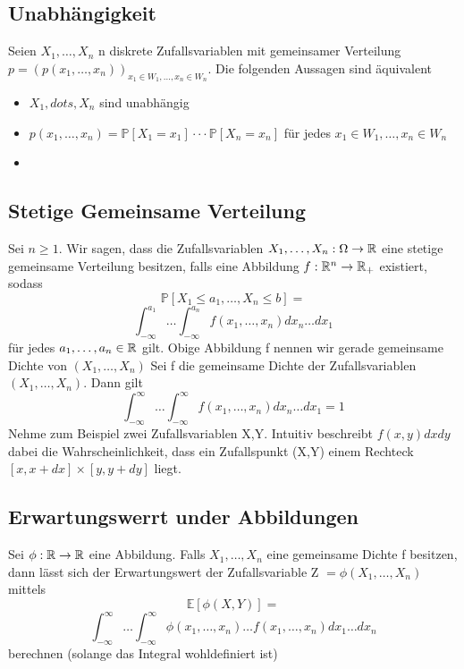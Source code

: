 \subsection{Unabhängigkeit}
\Satz[5.6] \newline
Seien \(X_1, \dots , X_n\) n diskrete Zufallsvariablen mit gemeinsamer Verteilung \(p = (p(x_1, \dots , x_n))_{x_1 \in W_1 , \dots , x_n \in W_n}\). Die folgenden Aussagen sind äquivalent
\begin{itemize}
    \item \(X_1, dots , X_n\) sind unabhängig
    \item \(p(x_1, \dots , x_n ) = \mathbb{P}[X_1 = x_1 ] \cdot \cdot \cdot \mathbb{P}[X_n = x_n ]\) für jedes \(x_1 \in W_1 , \dots , x_n \in W_n\)
    \item 
\end{itemize}
\subsection{Stetige Gemeinsame Verteilung}
\Def[5.7] \newline
Sei \( n \geq 1\). Wir sagen, dass die Zufallsvariablen \(X_1 , \dots , X_n : \Omega \rightarrow \mathbb{R} \) eine stetige gemeinsame Verteilung besitzen, falls eine Abbildung \( f: \mathbb{R}^n \rightarrow \mathbb{R}_+ \) existiert, sodass \[ \mathbb{P}[X_1 \leq a_1, \dots , X_n \leq b] = \] \[\int_{-\infty}^{a_1} \dots \int_{-\infty}^{a_n} f(x_1, \dots , x_n) dx_n \dots dx_1\]
für jedes  \( a_1 , \dots , a_n \in \mathbb{R} \) gilt. Obige Abbildung f nennen wir gerade gemeinsame Dichte von \((X_1, \dots , X_n)\) \newline
\Satz[5.9] \newline
Sei f die gemeinsame Dichte der Zufallsvariablen \((X_1, \dots , X_n)\). Dann gilt \[ \int_{-\infty}^\infty \dots \int_{-\infty}^\infty f(x_1, \dots , x_n )dx_n \dots dx_1 = 1\]
\Bem[5.9a] \newline
Nehme zum Beispiel zwei Zufallsvariablen X,Y. Intuitiv beschreibt \(f(x,y)dxdy\) dabei die Wahrscheinlichkeit, dass ein Zufallspunkt (X,Y) einem Rechteck \([x, x + dx] \times [y,y + dy]\) liegt. \newline
\subsection{Erwartungswerrt under Abbildungen}
\Satz[5.10] \newline
Sei \( \phi: \mathbb{R} \rightarrow \mathbb{R} \) eine Abbildung. Falls \( X_1, \dots , X_n\) eine gemeinsame Dichte f besitzen, dann lässt sich der Erwartungswert der Zufallsvariable Z \( = \phi (X_1, \dots , X_n )\) mittels \[ \mathbb{E}[\phi(X,Y)] = \] \[\int_{-\infty}^\infty \dots \int_{-\infty}^\infty \phi(x_1 , \dots , x_n) \dots f(x_1, \dots , x_n) dx_1 \dots dx_n\]
berechnen (solange das Integral wohldefiniert ist)
